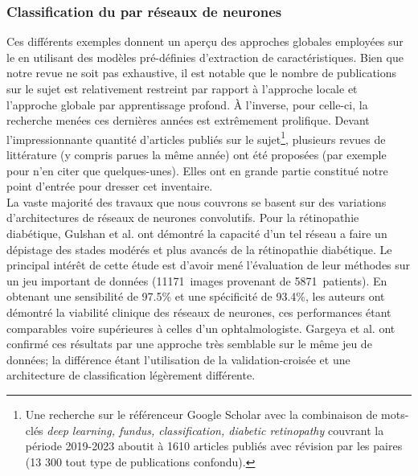 \subsubsection{Classification du \fundus{} par réseaux de neurones}
\label{sec:fundusClassification}
Ces différents exemples donnent un aperçu des approches globales employées sur le \fundus{} en utilisant des modèles pré-définies d'extraction de caractéristiques. Bien que notre revue ne soit pas exhaustive, il est notable que le nombre de publications sur le sujet est relativement restreint par rapport à l'approche locale et l'approche globale par apprentissage profond. À l'inverse, pour celle-ci, la recherche menées ces dernières années est extrêmement prolifique.  Devant l'impressionnante quantité d'articles publiés sur le sujet\footnote{Une recherche sur le référenceur Google Scholar avec la combinaison de mots-clés \textit{deep learning, fundus, classification, diabetic retinopathy} couvrant la période 2019-2023 aboutit à 1610 articles publiés avec révision par les paires (13 300 tout type de publications confondu).}, plusieurs revues de littérature (y compris parues la même année) ont été proposées (par exemple \cite{aminReviewRecentDevelopments2016, jeongReviewMachineLearning2022, bilalSurveyRecentDevelopments2021, article, suriyasekeranAlgorithmsDiagnosisDiabetic2021, randiveReviewComputeraidedRecent2019, goutamComprehensiveReviewDeep2022} pour n'en citer que quelques-unes). Elles ont en grande partie constitué notre point d'entrée pour dresser cet inventaire.
\\
La vaste majorité des travaux que nous couvrons se basent sur des variations d'architectures de réseaux de neurones convolutifs.
Pour la rétinopathie diabétique,  Gulshan et al.\cite{gulshanDevelopmentValidationDeep2016} ont démontré la capacité d'un tel réseau a faire un dépistage des stades modérés et plus avancés de la rétinopathie diabétique. Le principal intérêt de cette étude est d'avoir mené l'évaluation de leur méthodes sur un jeu important de données (\SI{11171}{images} provenant de \SI{5871}{patients}). En obtenant une sensibilité de 97.5\% et une spécificité de 93.4\%, les auteurs ont démontré la viabilité clinique des réseaux de neurones, ces performances étant comparables voire supérieures à celles d'un ophtalmologiste. Gargeya et al.\cite{gargeyaAutomatedIdentificationDiabetic2017} ont confirmé ces résultats par une approche très semblable sur le même jeu de données; la différence étant l'utilisation de la validation-croisée et une architecture de classification légèrement différente.
